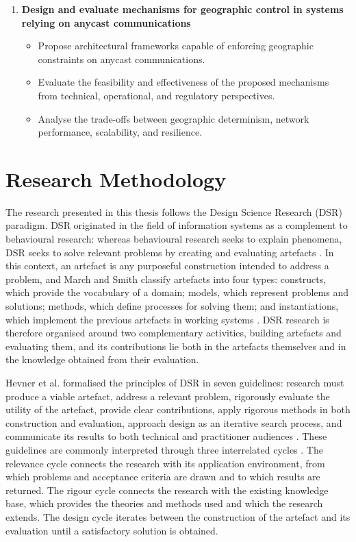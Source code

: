 \begin{enumerate}
    \item \textbf{Design and evaluate mechanisms for geographic control in systems relying on anycast communications}
    \begin{itemize}
        \item Propose architectural frameworks capable of enforcing geographic constraints on anycast communications.
        \item Evaluate the feasibility and effectiveness of the proposed mechanisms from technical, operational, and regulatory perspectives.
        \item Analyse the trade-offs between geographic determinism, network performance, scalability, and resilience.
    \end{itemize}
\end{enumerate}

\section{Research Methodology}
\label{sc:introduction_methodology}

The research presented in this thesis follows the Design Science Research (DSR) paradigm. DSR originated in the field of information systems as a complement to behavioural research: whereas behavioural research seeks to explain phenomena, DSR seeks to solve relevant problems by creating and evaluating artefacts \cite{Hevner2004DesignResearch}. In this context, an artefact is any purposeful construction intended to address a problem, and March and Smith classify artefacts into four types: constructs, which provide the vocabulary of a domain; models, which represent problems and solutions; methods, which define processes for solving them; and instantiations, which implement the previous artefacts in working systems \cite{March1995DesignTechnology}. DSR research is therefore organised around two complementary activities, building artefacts and evaluating them, and its contributions lie both in the artefacts themselves and in the knowledge obtained from their evaluation.

Hevner et al. formalised the principles of DSR in seven guidelines: research must produce a viable artefact, address a relevant problem, rigorously evaluate the utility of the artefact, provide clear contributions, apply rigorous methods in both construction and evaluation, approach design as an iterative search process, and communicate its results to both technical and practitioner audiences \cite{Hevner2004DesignResearch}. These guidelines are commonly interpreted through three interrelated cycles \cite{PDFResearch}. The relevance cycle connects the research with its application environment, from which problems and acceptance criteria are drawn and to which results are returned. The rigour cycle connects the research with the existing knowledge base, which provides the theories and methods used and which the research extends. The design cycle iterates between the construction of the artefact and its evaluation until a satisfactory solution is obtained.

